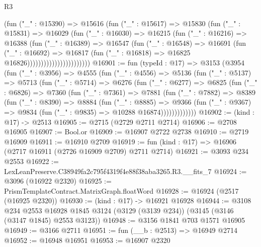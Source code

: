 \begin{lexlean}{R3}
\begin{coremodule}
                                (fun ("_" : @15390) =>
                                @15616
                                  (fun ("_" : @15617) =>
                                  @15830
                                    (fun ("_" : @15831) =>
                                    @16029
                                      (fun ("_" : @16030) =>
                                      @16215
                                        (fun ("_" : @16216) =>
                                        @16388
                                          (fun ("_" : @16389) =>
                                          @16547
                                            (fun ("_" : @16548) =>
                                            @16691
                                              (fun ("_" : @16692) =>
                                              @16817
                                                (fun ("_" : @16818) =>
                                                @16825 @16826)))))))))))))))))))))))
@16901 := fun (typeId : @17) =>
  @3153
    (@3954
      (fun ("_" : @3956) =>
      @4555
        (fun ("_" : @4556) =>
        @5136
          (fun ("_" : @5137) =>
          @5713
            (fun ("_" : @5714) =>
            @6276
              (fun ("_" : @6277) =>
              @6825
                (fun ("_" : @6826) =>
                @7360
                  (fun ("_" : @7361) =>
                  @7881
                    (fun ("_" : @7882) =>
                    @8389
                      (fun ("_" : @8390) =>
                      @8884
                        (fun ("_" : @8885) =>
                        @9366
                          (fun ("_" : @9367) =>
                          @9834 (fun ("_" : @9835) => @10288 @16874)))))))))))))
@16902 := (kind : @17) -> @2513
@16905 := @2715 (@2729 @2711 @2714)
@16906 := @2708 @16905
@16907 := Bool.or
@16909 := @16907 @2722 @2738
@16910 := @2719 @16909
@16911 := @16910 @2709
@16919 := fun (kind : @17) => @16906 (@2717 @16911 (@2726 @16909 @2709) @2711 @2714)
@16921 := @3093 @234 @2553
@16922 := LexLeanPreserve.C38949fa2c795f4319f4e88f38aba3265.R3.__fits_7
@16924 := @3096 (@16922 @2320)
@16925 := PrismTemplateContract.MatrixGraph.floatWord
@16928 := @16924 (@2517 (@16925 @2320))
@16930 := (kind : @17) -> @16921 @16928
@16944 := @3108
    @234
    @2553
    @16928
    @1845
    @3124
    (@3129 (@3139 @234))
    (@3145 (@3146 (@3147 @1845) @2553 @3123))
@16948 := @3156 @1841 @703 @1571 @16905
@16949 := @3166 @2711
@16951 := fun (__b : @2513) => @16949 @2714
@16952 := @16948 @16951
@16953 := @16907 @2320

\end{coremodule}
\end{lexlean}
